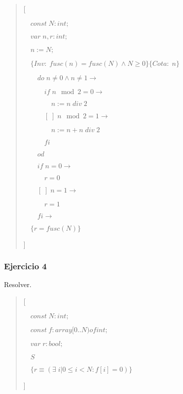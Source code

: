 \documentclass[hidelinks]{article}
\newenvironment{absolutelynopagebreak}
{\Needspace{10\baselineskip}\begin{quote}}
		{\end{quote}}
\begin{document}
\begin{absolutelynopagebreak}
	[\par
		$\quad const \; N: int;$\par
		$\quad var \; n, r : int;$\par
		$\quad n := N;$\par
		$\quad \{Inv:\; fusc(n) = fusc(N) \land N \geq 0\}\{Cota: \; n\}$ \par
		$\qquad do \; n \neq 0 \land n \neq 1 \rightarrow$ \par
		$\qquad \quad if \; n \mod 2 = 0 \rightarrow$ \par
		$\qquad \qquad n := n \; div \; 2$ \par
		$\qquad \quad [\;] \; n \mod 2 = 1 \rightarrow$ \par
		$\qquad \qquad n := n + n \; div \; 2 $ \par
		$\qquad \quad fi$ \par
		$\qquad od$ \par
		$\qquad if \; n = 0 \rightarrow$ \par
		$\qquad \quad r = 0$ \par
		$\qquad [\;] \; n = 1 \rightarrow$ \par
		$\qquad \quad r = 1$ \par
		$\qquad fi \rightarrow$ \par
		$\quad \{r = fusc(N)\}$ \par
	]\par
\end{absolutelynopagebreak}\par

\newpage

\subsubsection{Ejercicio 4}

Resolver.\par

\begin{absolutelynopagebreak}
	[\par
	$\quad const \; N: int;$\par
	$\quad const \; f: array [0..N) of int;$\par
			$\quad var \; r : bool;$\par
			$\quad S$\par
			$\quad \{r \equiv (\exists \; i| 0 \leq i < N: f[i] = 0)\}$ \par
		]\par
\end{absolutelynopagebreak}\par
\end{document}
